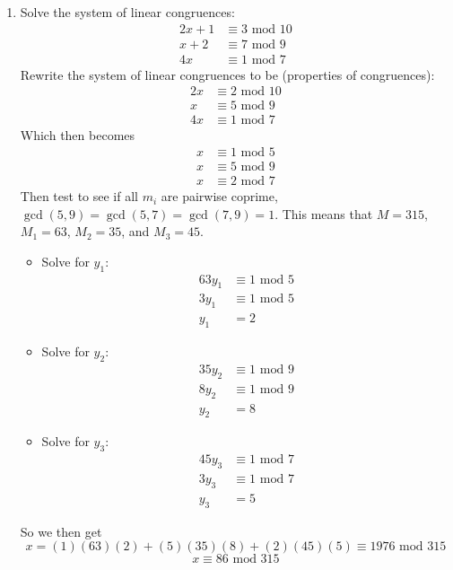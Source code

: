 \documentclass[class=article, crop=false]{standalone}
\begin{document}
\begin{enumerate}
\item
  Solve the system of linear congruences:
  \begin{align*}
	2x+1 & \equiv 3\mbox{ mod } 10 \\
	x+2 & \equiv 7\mbox{ mod } 9 \\
	4x & \equiv 1\mbox{ mod } 7
  \end{align*}
  Rewrite the system of linear congruences to be (properties of congruences):
  \begin{align*}
	2x &\equiv 2\mbox{ mod } 10 \\
	x &\equiv 5\mbox{ mod } 9 \\
	4x &\equiv 1\mbox{ mod } 7
  \end{align*}
  Which then becomes
  \begin{align*}
	x &\equiv 1\mbox{ mod } 5 \\
	x &\equiv 5\mbox{ mod } 9 \\
	x &\equiv 2\mbox{ mod } 7
  \end{align*}
  Then test to see if all $m_i$ are pairwise coprime, 
  $\gcd(5,9)=\gcd(5,7)=\gcd(7,9)=1$. This means that
  $M=315$, $M_1=63$, $M_2=35$, and $M_3=45$.
  \begin{itemize}
	\item[] Solve for $y_1$:
	  \begin{align*}
		63y_1 &\equiv 1\mbox{ mod }5 \\
		3y_1 &\equiv 1\mbox{ mod }5 \\
		y_1 &= 2
	  \end{align*}
	\item[] Solve for $y_2$:
	  \begin{align*}
		35y_2 &\equiv 1\mbox{ mod }9 \\
		8y_2 &\equiv 1\mbox{ mod }9 \\
		y_2 &= 8
	  \end{align*}
	\item[] Solve for $y_3$: 
	  \begin{align*}
		45y_3 &\equiv 1\mbox{ mod }7 \\
		3y_3 &\equiv 1\mbox{ mod }7 \\
		y_3 &=5
	  \end{align*}
  \end{itemize}
  So we then get
  $$x=(1)(63)(2) + (5)(35)(8) + (2)(45)(5) \equiv 1976 \mbox{ mod } 315$$
  $$x\equiv 86\mbox{ mod }315$$

\end{enumerate}


\end{document}
